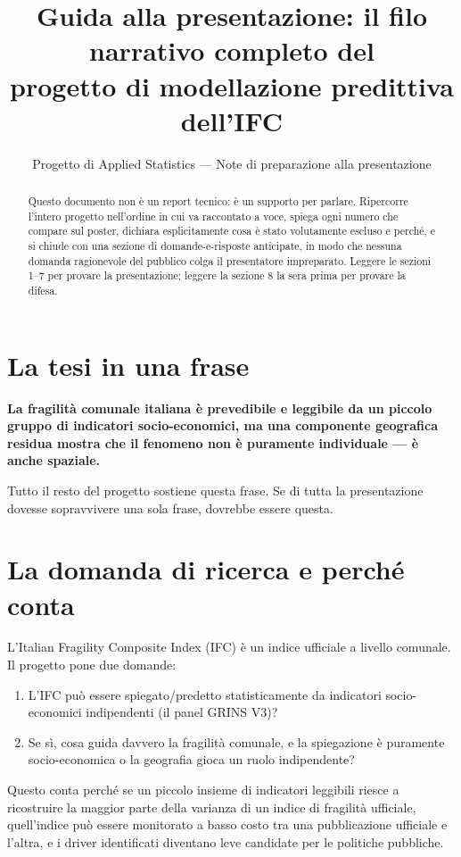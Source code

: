 \documentclass[11pt,a4paper]{article}
\title{Guida alla presentazione: il filo narrativo completo del\\
  progetto di modellazione predittiva dell'IFC}
\author{Progetto di Applied Statistics --- Note di preparazione alla presentazione}
\date{}
\begin{document}
\maketitle

\begin{abstract}
\noindent
Questo documento non è un report tecnico: è un supporto per parlare.
Ripercorre l'intero progetto nell'ordine in cui va raccontato a
voce, spiega ogni numero che compare sul poster, dichiara
esplicitamente cosa è stato volutamente escluso e perché, e si
chiude con una sezione di domande-e-risposte anticipate, in modo che
nessuna domanda ragionevole del pubblico colga il presentatore
impreparato. Leggere le sezioni 1--7 per provare la presentazione;
leggere la sezione 8 la sera prima per provare la difesa.
\end{abstract}

\section{La tesi in una frase}

\textbf{La fragilità comunale italiana è prevedibile e leggibile da
un piccolo gruppo di indicatori socio-economici, ma una componente
geografica residua mostra che il fenomeno non è puramente
individuale --- è anche spaziale.}

Tutto il resto del progetto sostiene questa frase. Se di tutta la
presentazione dovesse sopravvivere una sola frase, dovrebbe essere
questa.

\section{La domanda di ricerca e perché conta}

L'Italian Fragility Composite Index (IFC) è un indice ufficiale a
livello comunale. Il progetto pone due domande:

\begin{enumerate}[leftmargin=2em]
  \item L'IFC può essere spiegato/predetto statisticamente da
  indicatori socio-economici indipendenti (il panel GRINS V3)?
  \item Se sì, cosa guida davvero la fragilità comunale, e la
  spiegazione è puramente socio-economica o la geografia gioca un
  ruolo indipendente?
\end{enumerate}

Questo conta perché se un piccolo insieme di indicatori leggibili
riesce a ricostruire la maggior parte della varianza di un indice di
fragilità ufficiale, quell'indice può essere monitorato a basso
costo tra una pubblicazione ufficiale e l'altra, e i driver
identificati diventano leve candidate per le politiche pubbliche.
\end{document}
